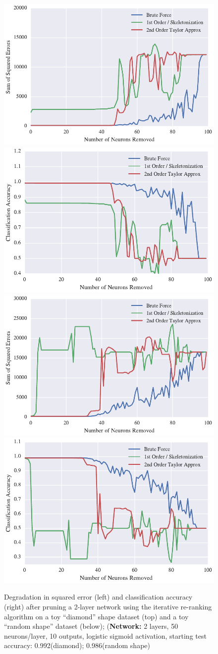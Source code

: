 \begin{figure}[!ht]
\centering
\includegraphics[width=0.49\linewidth]{diamond-iterative-rerank-method.pdf}
\includegraphics[width=0.49\linewidth]{diamond-iterative-rerank-accuracy.pdf}
\includegraphics[width=0.49\linewidth]{rshape-iterative-rerank-method.pdf}
\includegraphics[width=0.49\linewidth]{rshape-iterative-rerank-accuracy.pdf}
\caption{Degradation in squared error (left) and classification accuracy (right) after pruning a 2-layer network using the iterative re-ranking algorithm on a toy ``diamond'' shape dataset (top) and a toy ``random shape'' dataset (below); (\textbf{Network:} 2 layers, 50 neurons/layer, 10 outputs, logistic sigmoid activation, starting test accuracy: 0.992(diamond); 0.986(random shape)}
\label{fig:diamond}
\end{figure}


